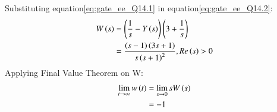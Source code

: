 \documentclass[journal,12pt,twocolumn]{IEEEtran}
\theoremstyle{remark}
\begin{document}
Substituting equation\eqref{eq:gate_ee_Q14.1} in  equation\eqref{eq:gate_ee_Q14.2}:
\begin{align}
    W\left(s\right) &= \left(\frac{1}{s} - Y\left(s\right)\right)\left(3 + \frac{1}{s}\right)\\
            &= \frac{\left(s-1\right)\left(3s+1\right)}{s\left(s+1\right)^2} ,  Re\left(s\right)>0
\end{align}
Applying Final Value Theorem on W:
\begin{align}
     \lim_{t \to \infty} w\left(t\right)&= \lim_{s \to 0} sW\left(s\right)\\
                            &= -1
\end{align}
\end{document}
